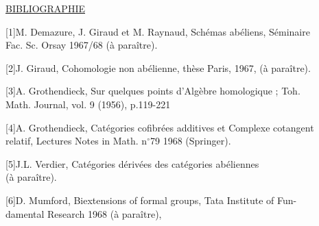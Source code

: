 \underline{BIBLIOGRAPHIE}

{[1]}\quad M. Demazure, J. Giraud et M. Raynaud, Schémas abéliens, Séminaire \\
\hspace*{4em}Fac. Sc. Orsay 1967/68 (à paraître).

{[2]}\quad J. Giraud, Cohomologie non abélienne, thèse Paris, 1967, (à paraître).

{[3]}\quad A. Grothendieck, Sur quelques points d'Algèbre homologique ; Toh. \\
\hspace*{4em}Math. Journal, vol. 9 (1956), p.119-221

{[4]}\quad A. Grothendieck, Catégories cofibrées additives et Complexe cotangent \\
\hspace*{4em}relatif, Lectures Notes in Math. n$^{\circ}$79 1968 (Springer).

{[5]}\quad J.L. Verdier, Catégories dérivées des catégories abéliennes \\
\hspace*{4em}(à paraître).

{[6]}\quad D. Mumford, Biextensions of formal groups, Tata Institute of Fun- \\
\hspace*{4em}damental Research 1968 (à paraître),
